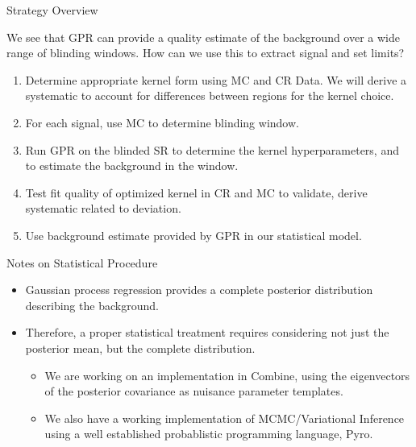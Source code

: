 \documentclass[10pt]{beamer}
\newif\iflong
\begin{document}
\begin{frame}{Strategy Overview}
  \begin{block}{}
    We see that GPR can provide a quality estimate of the background over a wide range of blinding windows. How can we use this to extract signal and set limits?
  \end{block}
  \begin{enumerate}
  \item Determine appropriate kernel form using MC and CR Data. We will derive a systematic to account for differences between regions for the kernel choice.
  \item For each signal, use MC to determine blinding window. 
  \item Run GPR on the blinded SR to determine the kernel hyperparameters, and to estimate the background in the window.
  \item Test fit quality of optimized kernel in CR and MC to validate, derive systematic related to deviation.
  \item\label{item:5} Use background estimate provided by GPR in our statistical model.
  \end{enumerate}
\end{frame}

\begin{frame}{Notes on Statistical Procedure}
  \begin{itemize}
  \item Gaussian process regression provides a complete posterior distribution describing the background. 
  \item Therefore, a proper statistical treatment requires considering not just the posterior mean, but the complete distribution.
    \begin{itemize}
    \item We are working on an implementation in Combine, using the eigenvectors of the posterior covariance as nuisance parameter templates. 
    \item We also have a working implementation of MCMC/Variational Inference using a well established probablistic programming language, Pyro.
    \end{itemize}
    \iflong  \item {\bfseries This is is an area of active work. } However, we have made steady progress and have an ``alpha'' implementation. Hope to present statistical framework in next 1-2 months. \fi
  \end{itemize}
\end{frame}
\end{document}
